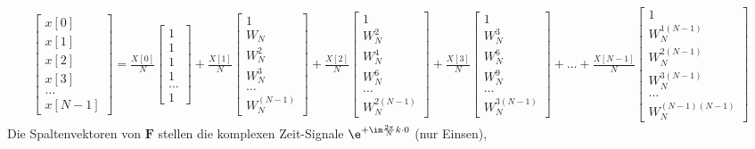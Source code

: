 \begin{align*}
\begin{bmatrix}
x[0]\\[1em]
x[1]\\[1em]
x[2]\\[1em]
x[3]\\[1em]
\dots\\[1em]
x[N-1]
\end{bmatrix}
=
\frac{X[0]}{N}
\begin{bmatrix}
1\\[1em]
1\\[1em]
1\\[1em]
1\\[1em]
\dots\\[1em]
1
\end{bmatrix}
+\frac{X[1]}{N}
\begin{bmatrix}
1\\[1em]
W_N\\[1em]
W_N^2\\[1em]
W_N^3\\[1em]
\dots\\[1em]
W_N^{(N-1)}
\end{bmatrix}
+\frac{X[2]}{N}
\begin{bmatrix}
1\\[1em]
W_N^2\\[1em]
W_N^4\\[1em]
W_N^6\\[1em]
\dots\\[1em]
W_N^{2(N-1)}
\end{bmatrix}
+\frac{X[3]}{N}
\begin{bmatrix}
1\\[1em]
W_N^3\\[1em]
W_N^6\\[1em]
W_N^9\\[1em]
\dots\\[1em]
W_N^{3(N-1)}
\end{bmatrix}
+
\dots
+\frac{X[N-1]}{N}
\begin{bmatrix}
1\\[1em]
W_N^{1(N-1)}\\[1em]
W_N^{2(N-1)}\\[1em]
W_N^{3(N-1)}\\[1em]
\dots\\[1em]
W_N^{(N-1)(N-1)}
\end{bmatrix}
\end{align*}
Die Spaltenvektoren von $\bm{F}$ stellen die komplexen Zeit-Signale
$\e^{+\im\frac{2\pi}{N}k \cdot 0}$ (nur Einsen),
